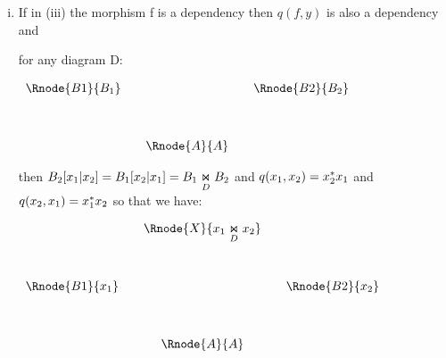 \documentclass[10pt,a4paper]{article}
\begin{document}
\begin{enumerate} [(i)]
\item If in (iii) the morphism f is a dependency then  $q(f,y)$ is also a dependency and 

\noindent for any diagram D:
\begin{center}
$
\begin{array}{cp{0cm}cp{0cm}c}
\Rnode{B1}{B_1}& &            &  &\Rnode{B2}{B_2} \\ [1.2cm]
               & &\Rnode{A}{A}& &
\end{array}
$
\end{center}

\noindent then
$B_2[x_1|x_2]=B_1[x_2|x_1] = \fibrex{B_1}{B_2}{D}$ and $q(x_1,x_2)= x_2\sub x_1 $ and $q(x_2,x_1)= x_1 \sub x_2$
\noindent
so that we have:

\begin{center}
$
\begin{array}{cp{0cm}cp{0cm}c}
               && \Rnode{X}{\fibrex{x_1}{x_2}{D}}&&                \\ [1.2cm]
\Rnode{B1}{x_1}&&                                && \Rnode{B2}{x_2} \\ [1.2cm]
               &&\Rnode{A}{A}                    && 
\end{array}
$
\end{center}







\end{enumerate}
\end{document}
